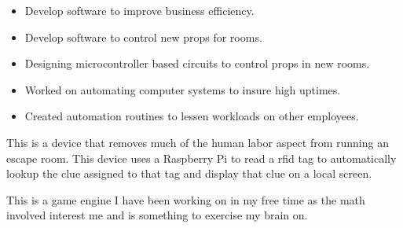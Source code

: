 \documentclass[10pt,a4paper,ragged2e,withhyper]{altacv}
\begin{document}
\begin{paracol}{2}

\begin{itemize}
\item Develop software to improve business efficiency.
\item Develop software to control new props for rooms.
\item Designing microcontroller based circuits to control props in new rooms.
\end{itemize}

\divider

\begin{itemize}
\item Worked on automating computer systems to insure high uptimes.
\item Created automation routines to lessen workloads on other employees. 
\end{itemize}


This is a device that removes much of the human labor aspect from running an escape room.
This device uses a Raspberry Pi to read a rfid tag to automatically lookup the clue assigned 
to that tag and display that clue on a local screen. 

\divider

This is a game engine I have been working on in my free time as the math involved interest me and
is something to exercise my brain on.

\medskip



\divider



\switchcolumn



\end{paracol}
\end{document}
